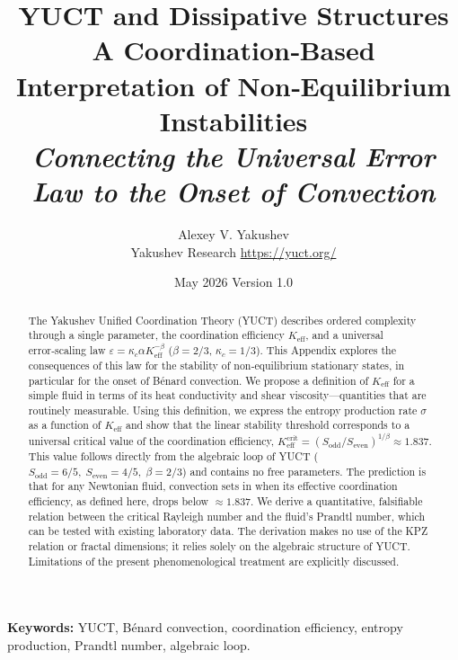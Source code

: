 \documentclass[12pt,a4paper]{article}
\begin{document}
	
	\title{\huge\textbf{YUCT and Dissipative Structures}\\[0.2cm]
		\Large A Coordination‑Based Interpretation of Non‑Equilibrium Instabilities\\[0.3cm]
		\large \textit{Connecting the Universal Error Law to the Onset of Convection}}
	\author{Alexey V. Yakushev\\[0.2cm] \small Yakushev Research \quad \url{https://yuct.org/}}
	\date{\small May 2026 \quad Version 1.0}
	\maketitle
	
	\begin{abstract}
		\noindent 
		The Yakushev Unified Coordination Theory (YUCT) describes ordered complexity through a single parameter, the coordination efficiency \(K_{\mathrm{eff}}\), and a universal error‑scaling law \(\varepsilon = \kappa_c\alpha K_{\mathrm{eff}}^{-\beta}\) (\(\beta = 2/3\), \(\kappa_c = 1/3\)).  This Appendix explores the consequences of this law for the stability of non‑equilibrium stationary states, in particular for the onset of B\'{e}nard convection.  We propose a definition of \(K_{\mathrm{eff}}\) for a simple fluid in terms of its heat conductivity and shear viscosity—quantities that are routinely measurable.  Using this definition, we express the entropy production rate \(\sigma\) as a function of \(K_{\mathrm{eff}}\) and show that the linear stability threshold corresponds to a universal critical value of the coordination efficiency, \(K_{\mathrm{eff}}^{\mathrm{crit}} = (S_{\mathrm{odd}}/S_{\mathrm{even}})^{1/\beta} \approx 1.837\).  This value follows directly from the algebraic loop of YUCT (\(S_{\mathrm{odd}} = 6/5,\; S_{\mathrm{even}} = 4/5,\; \beta = 2/3\)) and contains no free parameters.  The prediction is that for any Newtonian fluid, convection sets in when its effective coordination efficiency, as defined here, drops below $\approx 1.837$.  We derive a quantitative, falsifiable relation between the critical Rayleigh number and the fluid's Prandtl number, which can be tested with existing laboratory data.  The derivation makes no use of the KPZ relation or fractal dimensions; it relies solely on the algebraic structure of YUCT.  Limitations of the present phenomenological treatment are explicitly discussed.
	\end{abstract}
	\vspace{0.5cm}
	\noindent\textbf{Keywords:} YUCT, B\'{e}nard convection, coordination efficiency, entropy production, Prandtl number, algebraic loop.
	
\end{document}
